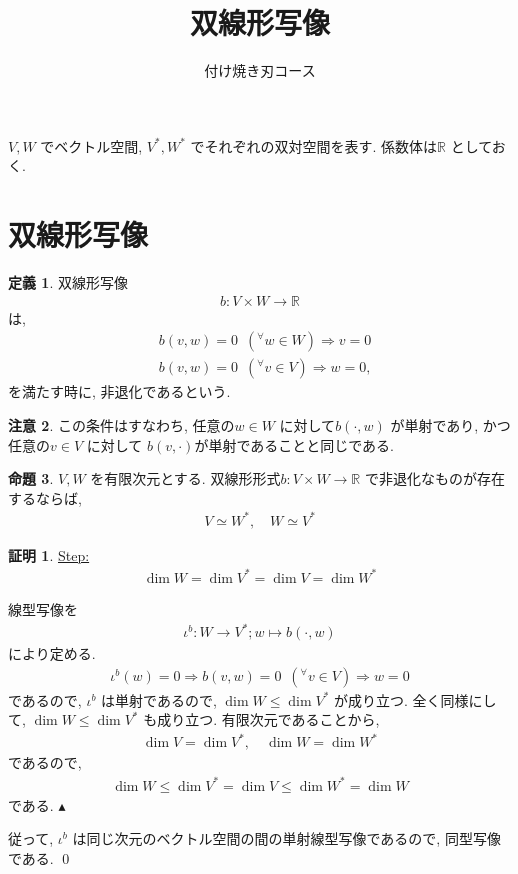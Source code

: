 \documentclass[10pt, fleqn, label-section=none]{bxjsarticle}
\title{双線形写像}
\date{}
\author{付け焼き刃コース}
\theoremstyle{definition}
\newtheorem{dfn}{定義}[section]
\newtheorem{prop}[dfn]{命題}
\newtheorem*{pf*}{証明}
\newtheorem{remark}[dfn]{注意}
\newcommand{\any}{{}^{\forall}}
\newcommand{\naraba}{\Rightarrow}
\renewcommand{\;}{\, ; \,}
\newenvironment{claim}[1]{\par\noindent\underline{Step:}\space#1}{}
\newenvironment{claimproof}[1]{\par\noindent{($\because$)}\space#1}{\hfill $\blacktriangle $}
\begin{document}
\maketitle


$V, W$ でベクトル空間, $V^*, W^*$ でそれぞれの双対空間を表す. 係数体は$\mathbb R$ としておく. 

\section{双線形写像}

\begin{dfn}双線形写像
\begin{align*} b: V \times W \rightarrow \mathbb R \end{align*}
は, 
\begin{align*} &b(v,w) = 0 \,\,\,(\any w \in W) \naraba v = 0 \\&  b(v,w) = 0 \,\,\, (\any v \in V) \naraba w = 0,\end{align*}
を満たす時に, 非退化であるという. 
\end{dfn}

\begin{remark}
この条件はすなわち, 任意の$w \in W$ に対して$b(\cdot , w)$ が単射であり, かつ任意の$v \in V$ に対して $b(v, \cdot)$が単射であることと同じである. 
\end{remark}

\begin{prop}
$V, W$ を有限次元とする. 双線形形式$b: V \times W \rightarrow \mathbb R$ で非退化なものが存在するならば, 
\begin{align*} V \simeq W^* , \quad W \simeq V^* \end{align*}
\end{prop}
\begin{pf*}

\begin{claim}
\begin{align*} \dim W = \dim V^* = \dim V = \dim W^* \end{align*}
\end{claim}
\begin{claimproof}
線型写像を
\begin{align*} \iota^b :W \rightarrow V^* ; w \mapsto b(\cdot, w) \end{align*}
により定める. 
\begin{align*} \iota^b(w) = 0 \naraba b(v, w) = 0\,\,\,(\any v \in V) \naraba w = 0\end{align*}
であるので, $\iota^b$ は単射であるので, $\dim W \leq \dim V^*$ が成り立つ. 全く同様にして, $\dim W \leq \dim V^*$ も成り立つ.
有限次元であることから, 
\begin{align*} \dim V = \dim V^* , \quad \dim W = \dim W^*  \end{align*}
であるので, 
\begin{align*} \dim W \leq \dim V^* = \dim V \leq \dim W^* = \dim W \end{align*}
である. 
\end{claimproof}

従って, $\iota^b$ は同じ次元のベクトル空間の間の単射線型写像であるので, 同型写像である. 
\qed
\end{pf*}
\end{document}
